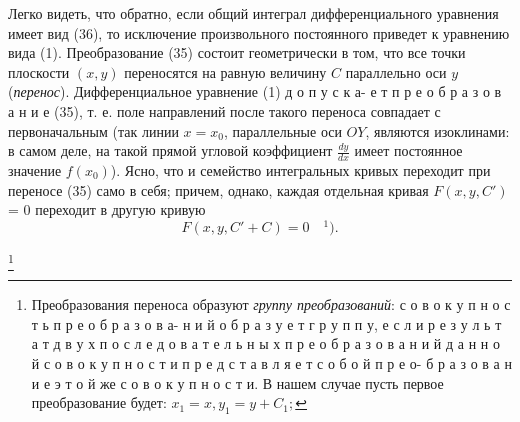 \documentclass{book}
\begin{document}
Легко видеть, что обратно, если общий интеграл дифференциального уравнения имеет вид (36), то исключение произвольного постоянного приведет к уравнению вида (1). Преобразование (35) состоит геометрически в том, что все точки плоскости $(x, y)$ переносятся на равную величину $C$ параллельно оси $y$ (\textit{перенос}). Дифференциальное уравнение (1) д о п у с к а- \linebreak е т \quad п р е о б р а з о в а н и е (35), т. е. поле направлений после такого переноса совпадает с первоначальным (так линии $x = x_0$, параллельные оси $OY$, являются изоклинами: в самом деле, на такой прямой угловой коэффициент $\frac{dy}{dx}$ имеет постоянное значение $f(x_0)$). Ясно, что и семейство интегральных кривых переходит при переносе (35) само в себя; причем, однако, каждая отдельная кривая $F(x, y, C')$ = 0 переходит в другую кривую
%
\begin{equation*}
F(x, y, C' + C) = 0 \quad ^1) .
\end{equation*}

\footnote{ \label{foot}
Преобразования переноса образуют \textit{группу преобразований}: с о в о к у п н о с т ь \quad п р е о б р а з о в а- н и й \quad о б р а з у е т \quad г р у п п у, \quad е с л и \quad р е з у л ь т а т \quad д в у х \quad п о с л е д о в а т е л ь н ы х \linebreak п р е о б р а з о в а н и й \quad д а н н о й \quad с о в о к у п н о с т и \quad п р е д с т а в л я е т \quad с о б о й \quad\quad п р е о- б р а з о в а н и е \quad э т о й \quad же \quad с о в о к у п н о с т и. В нашем случае пусть первое преобразование будет: $x_1 = x, y_1 = y + C_1;$
}
\end{document}
